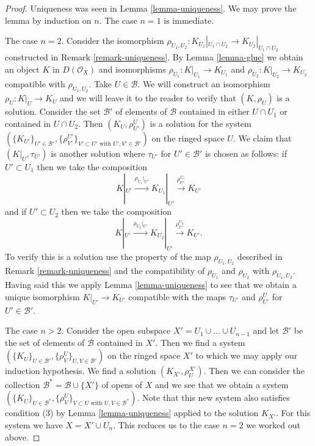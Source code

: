 \begin{proof}
Uniqueness was seen in Lemma \ref{lemma-uniqueness}. We may prove the lemma
by induction on $n$. The case $n = 1$ is immediate.

\medskip\noindent
The case $n = 2$.
Consider the isomorphism
$\rho_{U_1, U_2} : K_{U_1}|_{U_1 \cap U_2} \to K_{U_2}|_{U_1 \cap U_2}$
constructed in Remark \ref{remark-uniqueness}.
By Lemma \ref{lemma-glue} we obtain an object $K$ in $D(\mathcal{O}_X)$
and isomorphisms $\rho_{U_1} : K|_{U_1} \to K_{U_1}$ and
$\rho_{U_2} : K|_{U_2} \to K_{U_2}$ compatible with $\rho_{U_1, U_2}$.
Take $U \in \mathcal{B}$. We will construct an isomorphism
$\rho_U : K|_U \to K_U$ and we will leave it to the reader to verify
that $(K, \rho_U)$ is a solution. Consider the set $\mathcal{B}'$
of elements of $\mathcal{B}$ contained in either $U \cap U_1$ or contained in
$U \cap U_2$. Then $(K_U, \rho^U_{U'})$ is a solution for the system
$(\{K_{U'}\}_{U' \in \mathcal{B}'},
\{\rho_{V'}^{U'}\}_{V' \subset U'\text{ with }U', V' \in \mathcal{B}'})$
on the ringed space $U$.
We claim that $(K|_U, \tau_{U'})$ is another solution where
$\tau_{U'}$ for $U' \in \mathcal{B}'$ is chosen as follows:
if $U' \subset U_1$ then we take the composition
$$
K|_{U'} \xrightarrow{\rho_{U_1}|_{U'}}
K_{U_1}|_{U'} \xrightarrow{\rho^{U_1}_{U'}}
K_{U'}
$$
and if $U' \subset U_2$ then we take the composition
$$
K|_{U'} \xrightarrow{\rho_{U_2}|_{U'}}
K_{U_2}|_{U'} \xrightarrow{\rho^{U_2}_{U'}}
K_{U'}.
$$
To verify this is a solution use the property of the map $\rho_{U_1, U_2}$
described in Remark \ref{remark-uniqueness} and the compatibility of
$\rho_{U_1}$ and $\rho_{U_2}$ with $\rho_{U_1, U_2}$. Having said this
we apply Lemma \ref{lemma-uniqueness} to see that we obtain a unique
isomorphism $K|_{U'} \to K_{U'}$ compatible with the maps $\tau_{U'}$ and
$\rho^U_{U'}$ for $U' \in \mathcal{B}'$.

\medskip\noindent
The case $n > 2$. Consider the open subspace
$X' = U_1 \cup \ldots \cup U_{n - 1}$ and let $\mathcal{B}'$ be the set of
elements of $\mathcal{B}$ contained in $X'$. Then we find a system
$(\{K_U\}_{U \in \mathcal{B}'}, \{\rho_V^U\}_{U, V \in \mathcal{B}'})$
on the ringed space $X'$ to which we may apply our induction hypothesis.
We find a solution $(K_{X'}, \rho^{X'}_U)$.
Then we can consider the collection
$\mathcal{B}^* = \mathcal{B} \cup \{X'\}$ of opens of $X$ and we see that
we obtain a system
$(\{K_U\}_{U \in \mathcal{B}^*},
\{\rho_V^U\}_{V \subset U\text{ with }U, V \in \mathcal{B}^*})$.
Note that this new system also satisfies condition (3)
by Lemma \ref{lemma-uniqueness} applied to the solution $K_{X'}$.
For this system we have $X = X' \cup U_n$.
This reduces us to the case $n = 2$ we worked out above.
\end{proof}

